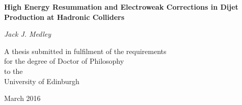\pagestyle{empty}

\begin{center}

\LARGE

{\bf High Energy Resummation and Electroweak Corrections in Dijet Production at Hadronic Colliders}

\vspace{1cm}

\begin{figure}[ht]
\begin{center}
\end{center}
\end{figure}

\large

{\it Jack J. Medley}

\vspace{2cm}
\normalsize
A thesis submitted in fulfilment of the requirements\\
for the degree of Doctor of Philosophy\\
to the\\
University of Edinburgh

March 2016
\end{center}

